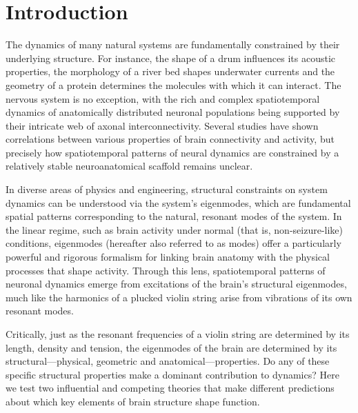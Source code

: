 \documentclass[sn-mathphys-num]{sn-jnl}%
\theoremstyle{thmstyleone}%
\theoremstyle{thmstyletwo}%
\theoremstyle{thmstylethree}%
\begin{document}
\section{Introduction}\label{sec1}

The dynamics of many natural systems are fundamentally constrained by their underlying structure. 
For instance, the shape of a drum influences its acoustic properties, the morphology of a river bed shapes underwater currents and the geometry of a protein determines the molecules with which it can interact\cite{yang2018geometric}. 
The nervous system is no exception, with the rich and complex spatiotemporal dynamics of anatomically distributed neuronal populations being supported by their intricate web of axonal interconnectivity\cite{nowack1995neocortical,braitenberg2013cortex}. 
Several studies have shown correlations between various properties of brain connectivity and activity\cite{damoiseaux2009greater}, but precisely how spatiotemporal patterns of neural dynamics are constrained by a relatively stable neuroanatomical scaffold remains unclear.

In diverse areas of physics and engineering, structural constraints on system dynamics can be understood via the system’s eigenmodes, which are fundamental spatial patterns corresponding to the natural, resonant modes of the system\cite{melrose1991electromagnetic}. 
In the linear regime, such as brain activity under normal (that is, non-seizure-like) conditions\cite{nozari2020brain}, eigenmodes (hereafter also referred to as modes) offer a particularly powerful and rigorous formalism for linking brain anatomy with the physical processes that shape activity. 
Through this lens, spatiotemporal patterns of neuronal dynamics emerge from excitations of the brain’s structural eigenmodes, much like the harmonics of a plucked violin string arise from vibrations of its own resonant modes.


Critically, just as the resonant frequencies of a violin string are determined by its length, density and tension, the eigenmodes of the brain are determined by its structural—physical, geometric and anatomical—properties. 
Do any of these specific structural properties make a dominant contribution to dynamics? 
Here we test two influential and competing theories that make different predictions about which key elements of brain structure shape function.
\end{document}
